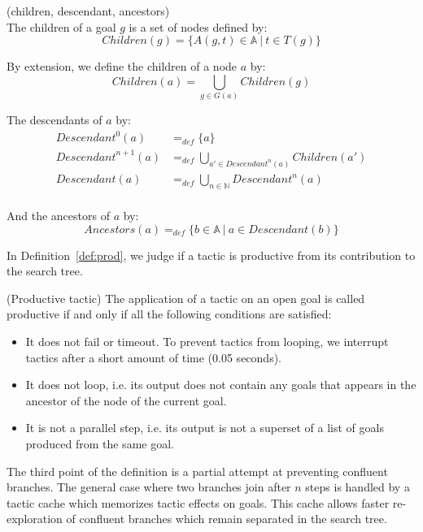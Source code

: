 \documentclass[runningheads,a4paper,draft]{svjour3}
\begin{document}
\begin{definition}\label{def:desc}(children, descendant, ancestors)\\
The children of a goal $g$ is a set of nodes defined by:
\[\mathit{Children}(g) = \lbrace A(g,t)\in \mathbb{A}\ |\ t \in T(g) \rbrace\]

By extension, we define the children of a node $a$ by:
\[\mathit{Children}(a) = \bigcup_{g \in G(a)} \mathit{Children}(g) \]

The descendants of $a$ by:
\begin{align*}
\mathit{Descendant}^{0}(a) &=_{def} \lbrace a \rbrace \\
\mathit{Descendant}^{n+1}(a) &=_{def} \bigcup_{a' \in \mathit{Descendant}^{n}(a)}
\mathit{Children}(a') \\
\mathit{Descendant}(a) &=_{def} \bigcup_{n \in \mathbb{N}} \mathit{Descendant}^n(a)\\
\end{align*}

And the ancestors of $a$ by:
\[\mathit{Ancestors}(a) =_{def} \lbrace b \in \mathbb{A} \ | \ a \in
Descendant(b) \rbrace\]

\end{definition}


In Definition~\ref{def:prod}, we judge if a tactic is productive from its
contribution to the search tree.

\begin{definition}\label{def:prod} (Productive tactic)
The application of a tactic on an open goal is called productive if and only if
all the following conditions are satisfied:
\begin{itemize}
\item It does not fail or timeout. To prevent tactics from looping, we
interrupt tactics after a short amount of time (0.05 seconds).
\item It does not loop, i.e. its output does not contain any goals that appears
in the ancestor of the node of the current goal.
\item It is not a parallel step, i.e. its output is not a superset
of a list of goals produced from the same goal.
\end{itemize}

The third point of the definition is a partial attempt at preventing confluent
branches. The general case where two branches join after $n$ steps is handled
by a tactic cache which memorizes tactic effects on goals. This
cache allows faster re-exploration of confluent branches which remain
separated in the search tree.
\end{definition}
\end{document}
